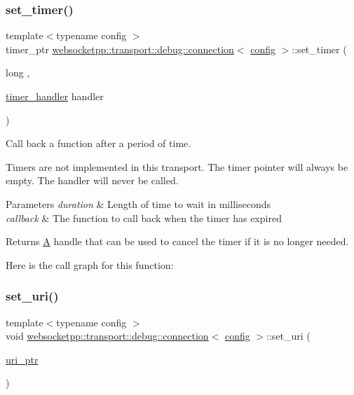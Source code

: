 \subsubsection{\texorpdfstring{set\+\_\+timer()}{set\_timer()}}
{\footnotesize\ttfamily template$<$typename config $>$ \\
timer\+\_\+ptr \mbox{\hyperlink{classwebsocketpp_1_1transport_1_1debug_1_1connection}{websocketpp\+::transport\+::debug\+::connection}}$<$ \mbox{\hyperlink{classconfig}{config}} $>$\+::set\+\_\+timer (\begin{DoxyParamCaption}\item[{long}]{,  }\item[{\mbox{\hyperlink{namespacewebsocketpp_1_1transport_a946cc56ff41139f3002149c15fd87bc9}{timer\+\_\+handler}}}]{handler }\end{DoxyParamCaption})\hspace{0.3cm}{\ttfamily [inline]}}



Call back a function after a period of time. 

Timers are not implemented in this transport. The timer pointer will always be empty. The handler will never be called.


\begin{DoxyParams}{Parameters}
{\em duration} & Length of time to wait in milliseconds \\
\hline
{\em callback} & The function to call back when the timer has expired \\
\hline
\end{DoxyParams}
\begin{DoxyReturn}{Returns}
\mbox{\hyperlink{struct_a}{A}} handle that can be used to cancel the timer if it is no longer needed. 
\end{DoxyReturn}
Here is the call graph for this function\+:
\mbox{\label{classwebsocketpp_1_1transport_1_1debug_1_1connection_a30a06b3bfd0bd2b61822724c99911f1c}} 
\subsubsection{\texorpdfstring{set\+\_\+uri()}{set\_uri()}}
{\footnotesize\ttfamily template$<$typename config $>$ \\
void \mbox{\hyperlink{classwebsocketpp_1_1transport_1_1debug_1_1connection}{websocketpp\+::transport\+::debug\+::connection}}$<$ \mbox{\hyperlink{classconfig}{config}} $>$\+::set\+\_\+uri (\begin{DoxyParamCaption}\item[{\mbox{\hyperlink{namespacewebsocketpp_aae370ea5ac83a8ece7712cb39fc23f5b}{uri\+\_\+ptr}}}]{ }\end{DoxyParamCaption})\hspace{0.3cm}{\ttfamily [inline]}}



